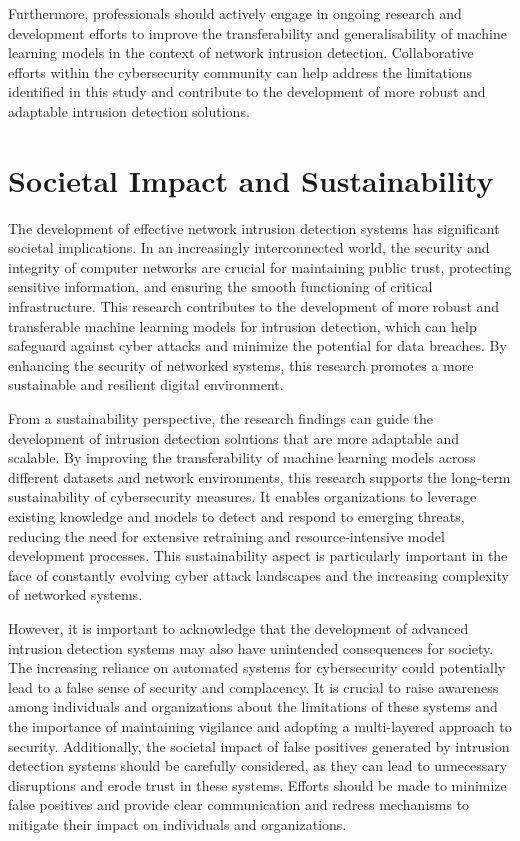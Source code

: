 Furthermore, professionals should actively engage in ongoing research and development efforts to improve the transferability and generalisability of machine learning models in the context of network intrusion detection. Collaborative efforts within the cybersecurity community can help address the limitations identified in this study and contribute to the development of more robust and adaptable intrusion detection solutions.

\section{Societal Impact and Sustainability}
The development of effective network intrusion detection systems has significant societal implications. In an increasingly interconnected world, the security and integrity of computer networks are crucial for maintaining public trust, protecting sensitive information, and ensuring the smooth functioning of critical infrastructure. This research contributes to the development of more robust and transferable machine learning models for intrusion detection, which can help safeguard against cyber attacks and minimize the potential for data breaches. By enhancing the security of networked systems, this research promotes a more sustainable and resilient digital environment.

From a sustainability perspective, the research findings can guide the development of intrusion detection solutions that are more adaptable and scalable. By improving the transferability of machine learning models across different datasets and network environments, this research supports the long-term sustainability of cybersecurity measures. It enables organizations to leverage existing knowledge and models to detect and respond to emerging threats, reducing the need for extensive retraining and resource-intensive model development processes. This sustainability aspect is particularly important in the face of constantly evolving cyber attack landscapes and the increasing complexity of networked systems.

However, it is important to acknowledge that the development of advanced intrusion detection systems may also have unintended consequences for society. The increasing reliance on automated systems for cybersecurity could potentially lead to a false sense of security and complacency. It is crucial to raise awareness among individuals and organizations about the limitations of these systems and the importance of maintaining vigilance and adopting a multi-layered approach to security. Additionally, the societal impact of false positives generated by intrusion detection systems should be carefully considered, as they can lead to unnecessary disruptions and erode trust in these systems. Efforts should be made to minimize false positives and provide clear communication and redress mechanisms to mitigate their impact on individuals and organizations.

